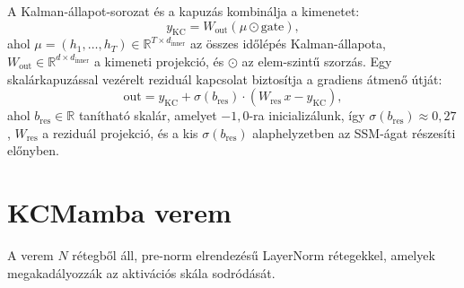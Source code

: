 A Kalman-állapot-sorozat és a kapuzás kombinálja a kimenetet:
\begin{equation}
    y_\text{KC} = W_\text{out}(\mu \odot \text{gate}),
\end{equation}
ahol $\mu = (h_1, \ldots, h_T) \in \mathbb{R}^{T \times d_\text{inner}}$
az összes időlépés Kalman-állapota, $W_\text{out} \in \mathbb{R}^{d \times d_\text{inner}}$
a kimeneti projekció, és $\odot$ az elem-szintű szorzás.
Egy skalárkapuzással vezérelt reziduál kapcsolat biztosítja a gradiens
átmenő útját:
\begin{equation}
    \text{out} = y_\text{KC} + \sigma(b_\text{res}) \cdot
                 (W_\text{res}\,x - y_\text{KC}),
\end{equation}
ahol $b_\text{res} \in \mathbb{R}$ tanítható skalár, amelyet $-1{,}0$-ra
inicializálunk, így $\sigma(b_\text{res}) \approx 0{,}27$,
$W_\text{res}$ a reziduál projekció, és a kis $\sigma(b_\text{res})$
alaphelyzetben az SSM-ágat részesíti előnyben.

\section{KCMamba verem}
\label{sec:kc_stack}

A verem $N$ rétegből áll, pre-norm elrendezésű LayerNorm rétegekkel,
amelyek megakadályozzák az aktivációs skála sodródását.

